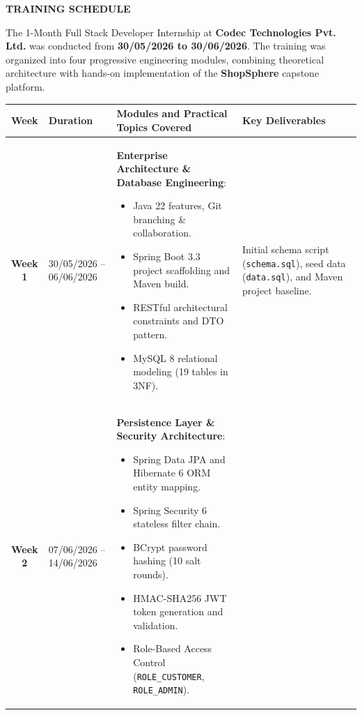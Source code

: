 \newpage
\thispagestyle{fancy}
\begin{center}
    {\fontsize{16}{20}\selectfont \textbf{TRAINING SCHEDULE}}\\[0.6cm]
\end{center}

\noindent The 1-Month Full Stack Developer Internship at \textbf{Codec Technologies Pvt. Ltd.} was conducted from \textbf{30/05/2026 to 30/06/2026}. The training was organized into four progressive engineering modules, combining theoretical architecture with hands-on implementation of the \textbf{ShopSphere} capstone platform.

\vspace{0.4cm}

\begin{table}[H]
\centering
\fontsize{10.5}{14}\selectfont
\begin{tabularx}{\textwidth}{|c|p{3.2cm}|X|p{2.8cm}|}
\hline
\textbf{Week} & \textbf{Duration} & \textbf{Modules and Practical Topics Covered} & \textbf{Key Deliverables} \\
\hline
\textbf{Week 1} & 
30/05/2026 -- 06/06/2026 & 
\textbf{Enterprise Architecture \& Database Engineering}:
\begin{itemize}[leftmargin=1.2em, topsep=2pt, parsep=0pt]
    \item Java 22 features, Git branching \& collaboration.
    \item Spring Boot 3.3 project scaffolding and Maven build.
    \item RESTful architectural constraints and DTO pattern.
    \item MySQL 8 relational modeling (19 tables in 3NF).
\end{itemize} & 
Initial schema script (\texttt{schema.sql}), seed data (\texttt{data.sql}), and Maven project baseline. \\
\hline
\textbf{Week 2} & 
07/06/2026 -- 14/06/2026 & 
\textbf{Persistence Layer \& Security Architecture}:
\begin{itemize}[leftmargin=1.2em, topsep=2pt, parsep=0pt]
    \item Spring Data JPA and Hibernate 6 ORM entity mapping.
    \item Spring Security 6 stateless filter chain.
    \item BCrypt password hashing (10 salt rounds).
    \item HMAC-SHA256 JWT token generation and validation.
    \item Role-Based Access Control (\texttt{ROLE\_CUSTOMER}, \texttt{ROLE\_ADMIN}).

\end{itemize}
\end{tabularx}
\end{table}
